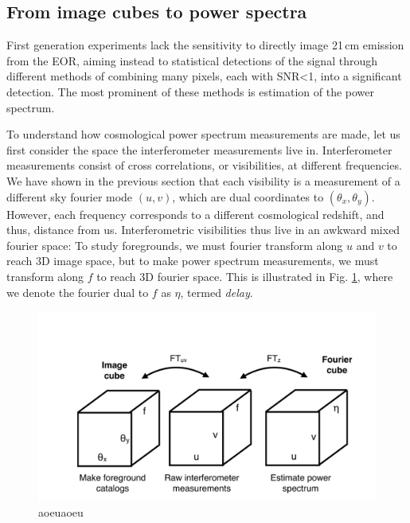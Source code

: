\subsection{From image cubes to power spectra}

First generation experiments lack the sensitivity to directly image 21\,cm emission from the EOR, aiming instead to statistical detections of the signal through different methods of combining many pixels, each with SNR<1, into a significant detection. The most prominent of these methods is estimation of the power spectrum.

To understand how cosmological power spectrum measurements are made, let us first consider the space the interferometer measurements live in. Interferometer measurements consist of cross correlations, or visibilities, at different frequencies. We have shown in the previous section that each visibility is a measurement of a different sky fourier mode $(u,v)$, which are dual coordinates to $(\theta_x,\theta_y)$. However, each frequency corresponds to a different cosmological redshift, and thus, distance from us. Interferometric visibilities thus live in an awkward mixed fourier space: To study foregrounds, we must fourier transform along $u$ and $v$ to reach 3D image space, but to make power spectrum measurements, we must transform along $f$ to reach 3D fourier space. This is illustrated in Fig. \ref{fig:ifospace}, where we denote the fourier dual to $f$ as $\eta$, termed \textit{delay}.

\begin{figure}[h]
    \centering
    \includegraphics[width=1\textwidth]{chap0_intro/ifo_space.pdf}
    \caption[Representation of the relation between image space, fourier space, and interferometer space]{aoeuaoeu}
    \label{fig:ifospace}
\end{figure}

